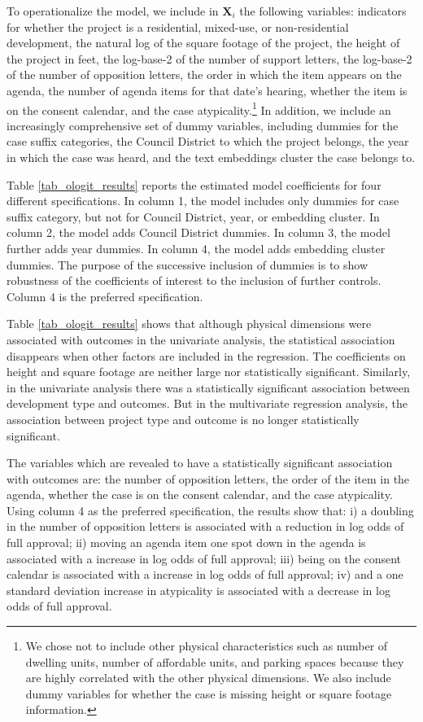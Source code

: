 To operationalize the model, we include in $\mathbf{X}_i$ the following variables: indicators for whether the project is a residential, mixed-use, or non-residential development, the natural log of the square footage of the project, the height of the project in feet, the log-base-2 of the number of support letters, the log-base-2 of the number of opposition letters, the order in which the item appears on the agenda, the number of agenda items for that date's hearing, whether the item is on the consent calendar, and the case atypicality.\footnote{We chose not to include other physical characteristics such as number of dwelling units, number of affordable units, and parking spaces because they are highly correlated with the other physical dimensions. We also include dummy variables for whether the case is missing height or square footage information.} In addition, we include an increasingly comprehensive set of dummy variables, including dummies for the case suffix categories, the Council District to which the project belongs, the year in which the case was heard, and the text embeddings cluster the case belongs to.

Table \ref{tab_ologit_results} reports the estimated model coefficients for four different specifications. In column 1, the model includes only dummies for case suffix category, but not for Council District, year, or embedding cluster. In column 2, the model adds Council District dummies. In column 3, the model further adds year dummies. In column 4, the model adds embedding cluster dummies. The purpose of the successive inclusion of dummies is to show robustness of the coefficients of interest to the inclusion of further controls. Column 4 is the preferred specification.

Table \ref{tab_ologit_results} shows that although physical dimensions were associated with outcomes in the univariate analysis, the statistical association disappears when other factors are included in the regression. The coefficients on height and square footage are neither large nor statistically significant. Similarly, in the univariate analysis there was a statistically significant association between development type and outcomes. But in the multivariate regression analysis, the association between project type and outcome is no longer statistically significant.

The variables which are revealed to have a statistically significant association with outcomes are: the number of opposition letters, the order of the item in the agenda, whether the case is on the consent calendar, and the case atypicality. Using column 4 as the preferred specification, the results show that: i) a doubling in the number of opposition letters is associated with a  reduction in log odds of full approval; ii) moving an agenda item one spot down in the agenda is associated with a  increase in log odds of full approval; iii) being on the consent calendar is associated with a  increase in log odds of full approval; iv) and a one standard deviation increase in atypicality is associated with a  decrease in log odds of full approval.

